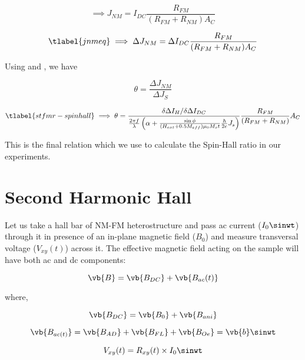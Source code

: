 \begin{equation}
    \implies J_{NM} = I_{DC} \frac{R_{FM}}{(R_{FM} + R_{NM})A_C}
\end{equation}

\begin{equation}
    \tlabel{jnmeq}
    \implies \Delta J_{NM} = \Delta I_{DC} \frac{R_{FM}}{(R_{FM} + R_{NM})A_C}
\end{equation}


Using  and  , we have

\begin{equation}
    \theta = \frac{\Delta J_{NM}}{\Delta J_{S}}
\end{equation}

\begin{equation}
    \tlabel{stfmr-spinhall}
    \implies \theta = \frac{\delta \Delta I_{H}/\delta \Delta I_{DC}}{
        \frac{2\pi f}{\lambda} \left( 
        \alpha + \frac{\sin{\phi}}{(H_{ext} + 0.5M_{eff}) \mu_{0} M_{s} t} 
        \frac{\hbar}{2e}J_{s}
        \right)
    } \frac{R_{FM}}{(R_{FM} + R_{NM})}A_C
\end{equation}

This is the final relation which we use to calculate the Spin-Hall ratio in our experiments.

\section{Second Harmonic Hall}

Let us take a hall bar of NM-FM heterostructure and pass ac current ($I_{0} \sinwt $) 
through it in presence of an in-plane magnetic field ($B_0$) and measure transversal voltage 
($V_{xy}(t)$) across it. The effective magnetic field acting on the sample will have both ac
 and dc components:

\begin{equation}
    \vb{B} = \vb{B_{DC}} + \vb{B_{ac}(t)}
\end{equation}

where,

\begin{equation}
    \vb{B_{DC}} = \vb{B_0} + \vb{B_{ani}}
\end{equation}

\begin{equation}
    \vb{B_{ac(t)}} = \vb{B_{AD}} + \vb{B_{FL}} + \vb{B_{Oe}} = \vb{b} \sinwt
\end{equation}

\begin{equation}
    V_{xy}(t) = R_{xy}(t) \times I_{0} \sinwt
\end{equation}

